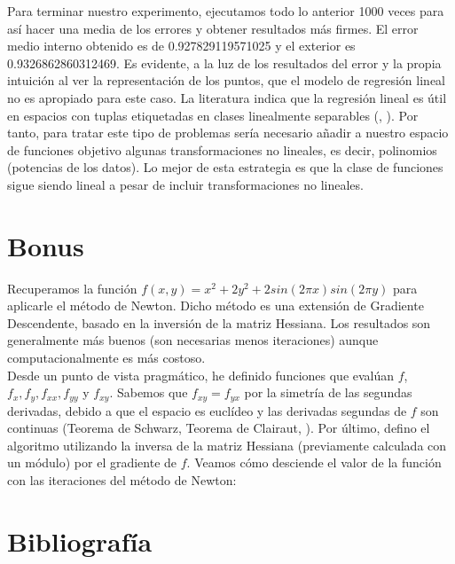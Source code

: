 Para terminar nuestro experimento, ejecutamos todo lo anterior 1000 veces para así hacer una media de los errores y obtener resultados más firmes. El error medio interno obtenido es de 0.927829119571025 y el exterior es  0.9326862860312469. Es evidente, a la luz de los resultados del error y la propia intuición al ver la representación de los puntos, que el modelo de regresión lineal no es apropiado para este caso. La literatura indica que la regresión lineal es útil en espacios con tuplas etiquetadas en clases linealmente separables (\cite{lfd}, \cite{ctm}). Por tanto, para tratar este tipo de problemas sería necesario añadir a nuestro espacio de funciones objetivo algunas transformaciones no lineales, es decir, polinomios (potencias de los datos). Lo mejor de esta estrategia es que la clase de funciones sigue siendo lineal a pesar de incluir transformaciones no lineales.

\section{Bonus}

Recuperamos la función $f(x,y)=x^2+2y^2+2sin(2\pi x) sin(2\pi y)$ para aplicarle el método de Newton. Dicho método es una extensión de Gradiente Descendente, basado en la inversión de la matriz Hessiana. Los resultados son generalmente más buenos (son necesarias menos iteraciones) aunque computacionalmente es más costoso. \\

Desde un punto de vista pragmático, he definido funciones que evalúan $f$, $f_x,f_y, f_{xx},f_{yy}$ y $f_{xy}$. Sabemos que $f_{xy} = f_{yx}$ por la simetría de las segundas derivadas, debido a que el espacio es euclídeo y las derivadas segundas de $f$ son continuas (Teorema de Schwarz, Teorema de Clairaut, \cite{rudin}). Por último, defino el algoritmo utilizando la inversa de la matriz Hessiana (previamente calculada con un módulo) por el gradiente de $f$. Veamos cómo desciende el valor de la función con las iteraciones del método de Newton:

\newpage
\section{Bibliografía}




